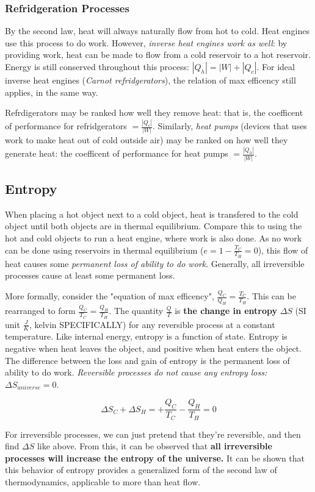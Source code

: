 \documentclass[12pt, a4paper]{article}
\theoremstyle{definition}
\begin{document}
\subsubsection{Refridgeration Processes}
By the second law, heat will always naturally flow from hot to cold.
Heat engines use this process to do work.
However, \textit{inverse heat engines work as well}: by providing work, heat can be made to flow from a cold reservoir to a hot reservoir.
Energy is still conserved throughout this process: $|Q_h| = |W| + |Q_c|$.
For ideal inverse heat engines (\textit{Carnot refridgerators}), the relation of max efficency still applies, in the same way.

Refrdigerators may be ranked how well they remove heat: that is, the coefficent of performance for refridgerators $= \frac{|Q_c|}{|W|}$.
Similarly, \textit{heat pumps} (devices that uses work to make heat out of cold outside air) may be ranked on how well they generate heat: the coefficent of performance for heat pumps $= \frac{|Q_h|}{|W|}$.

\subsection{Entropy}
When placing a hot object next to a cold object, heat is transfered to the cold object until both objects are in thermal equilibrium.
Compare this to using the hot and cold objects to run a heat engine, where work is also done.
As no work can be done using reservoirs in thermal equilibrium ($e = 1 - \frac{T_C}{T_H} = 0$), this flow of heat causes some \textit{permanent loss of ability to do work}.
Generally, all irreversible processes cause at least some permanent loss.

More formally, consider the "equation of max efficency", $\frac{Q_C}{Q_H} = \frac{T_C}{T_H}$.
This can be rearranged to form $\frac{Q_C}{T_C} = \frac{Q_H}{T_H}$.
The quantity $\frac{Q}{T}$ is \textbf{the change in entropy} $\Delta S$ (SI unit $\frac{J}{K}$, kelvin SPECIFICALLY) for any reversible process at a constant temperature.
Like internal energy, entropy is a function of state.
Entropy is negative when heat leaves the object, and positive when heat enters the object.
The difference between the loss and gain of entropy is the permanent loss of ability to do work.
\textit{Reversible processes do not cause any entropy loss:} $\Delta S_{universe} = 0$.

\[\Delta S_C + \Delta S_H = +\frac{Q_C}{T_C} - \frac{Q_H}{T_H} = 0\]

For irreversible processes, we can just pretend that they're reversible, and then find $\Delta S$ like above.
From this, it can be observed that \textbf{all irreversible processes will increase the entropy of the universe.}
It can be shown that this behavior of entropy provides a generalized form of the second law of thermodynamics, applicable to more than heat flow.
\end{document}
